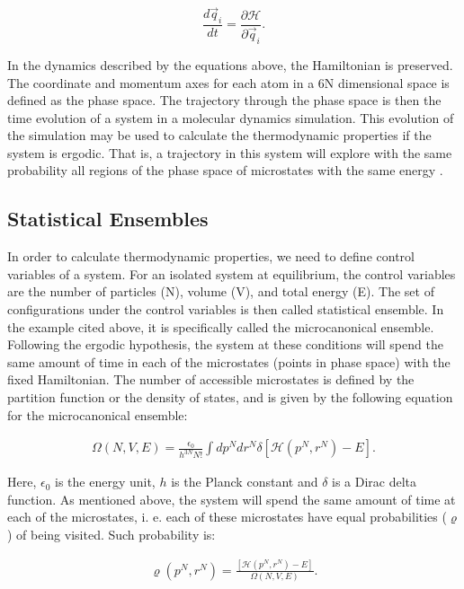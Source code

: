 \begin{equation}
\frac{d \vec{q}_{i}}{dt} =  \frac{\partial \mathcal{H}}{\partial \vec{q}_{i}}.
\end{equation}

In the dynamics described by the equations above, the Hamiltonian is preserved. The coordinate and momentum axes for each atom in a 6N dimensional space is defined as the phase space. The trajectory through the phase space is then the time evolution of a system in a molecular dynamics simulation. This evolution of the simulation may be used to calculate the thermodynamic properties if the system is ergodic. That is, a trajectory in this system will explore with the same probability all regions of the phase space of microstates with the same energy \cite{shell2015}. 

\subsection{Statistical Ensembles}

In order to calculate thermodynamic properties, we need to define control variables of a system. For an isolated system at equilibrium, the control variables are the number of particles (N), volume (V), and total energy (E). The set of configurations under the control variables is then called statistical ensemble. In the example cited above, it is specifically called the microcanonical ensemble. Following the ergodic hypothesis, the system at these conditions will spend the same amount of time in each of the microstates (points in phase space) with the fixed Hamiltonian.  The number of accessible microstates is defined by the partition function or the density of states, and  is given by the following equation  for the microcanonical ensemble: 

\begin{equation}
\begin{aligned}
\Omega (N,V,E) = \frac{\epsilon_{0}}{h^{3N}N!} \int dp^{N} dr^{N} \delta [\mathcal{H}(p^{N},r^{N}) -E].
\end{aligned}
\end{equation}

Here, $\epsilon _{0}$ is the energy unit, $h$ is the Planck constant and $\delta$ is a Dirac delta function. As mentioned above, the system will spend the same amount of time at each of the microstates, i. e. each of these microstates have equal probabilities ($\varrho$) of being visited. Such probability is:

\begin{equation}
\begin{aligned}
\varrho (p^{N},r^{N}) = \frac{[\mathcal{H}(p^{N},r^{N}) -E]}{ \Omega (N,V,E)} .
\end{aligned}
\end{equation}

